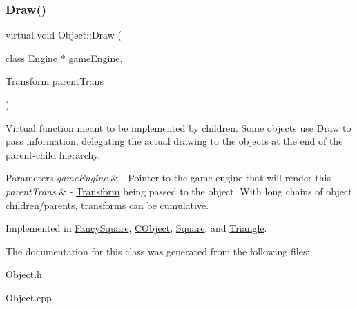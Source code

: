 \subsubsection{\texorpdfstring{Draw()}{Draw()}}
{\footnotesize\ttfamily virtual void Object\+::\+Draw (\begin{DoxyParamCaption}\item[{class \hyperlink{class_engine}{Engine} $\ast$}]{game\+Engine,  }\item[{\hyperlink{class_transform}{Transform}}]{parent\+Trans }\end{DoxyParamCaption})\hspace{0.3cm}{\ttfamily [pure virtual]}}



Virtual function meant to be implemented by children. Some objects use Draw to pass information, delegating the actual drawing to the objects at the end of the parent-\/child hierarchy. 


\begin{DoxyParams}{Parameters}
{\em game\+Engine} & -\/ Pointer to the game engine that will render this \\
\hline
{\em parent\+Trans} & -\/ \hyperlink{class_transform}{Transform} being passed to the object. With long chains of object children/parents, transforms can be cumulative. \\
\hline
\end{DoxyParams}


Implemented in \hyperlink{class_fancy_square_ac77d35ba8ab766f8a3e35f68e7344953}{Fancy\+Square}, \hyperlink{class_c_object_a65338dd4ac20a20340875597344c0c4b}{C\+Object}, \hyperlink{class_square_a9a533e0dd001a0b883bea5145c7444e0}{Square}, and \hyperlink{class_triangle_a2c8418bbe7a955b9ad53571a5832e1b0}{Triangle}.



The documentation for this class was generated from the following files\+:\begin{DoxyCompactItemize}
\item 
Object.\+h\item 
Object.\+cpp\end{DoxyCompactItemize}

